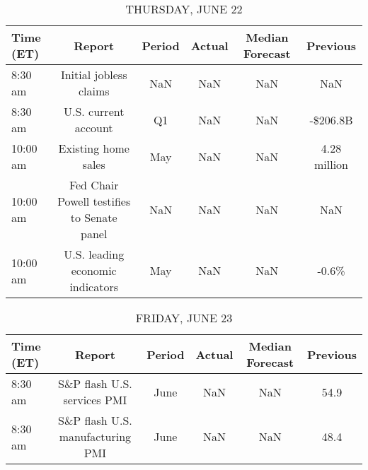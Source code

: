 \documentclass{article}%
\begin{document}
%


\begin{table}[htbp]%
\caption{THURSDAY, JUNE 22}%
\centering%
\begin{adjustbox}{width=1\textwidth}%
\begin{tabular}{lccccc}
\toprule
Time (ET) &                                     Report & Period & Actual & Median Forecast &     Previous \\
\midrule
  8:30 am &                     Initial jobless claims &    NaN &    NaN &             NaN &          NaN \\
  8:30 am &                       U.S. current account &     Q1 &    NaN &             NaN &     -\$206.8B \\
 10:00 am &                        Existing home sales &    May &    NaN &             NaN & 4.28 million \\
 10:00 am & Fed Chair Powell testifies to Senate panel &    NaN &    NaN &             NaN &          NaN \\
 10:00 am &           U.S. leading economic indicators &    May &    NaN &             NaN &        -0.6\% \\
\bottomrule
\end{tabular}
%
\end{adjustbox}%
\end{table}

%


\begin{table}[htbp]%
\caption{FRIDAY, JUNE 23}%
\centering%
\begin{adjustbox}{width=1\textwidth}%
\begin{tabular}{lccccc}
\toprule
Time (ET) &                           Report & Period & Actual & Median Forecast & Previous \\
\midrule
  8:30 am &      S\&P flash U.S. services PMI &   June &    NaN &             NaN &     54.9 \\
  8:30 am & S\&P flash U.S. manufacturing PMI &   June &    NaN &             NaN &     48.4 \\
\bottomrule
\end{tabular}
%
\end{adjustbox}%
\end{table}
\end{document}
